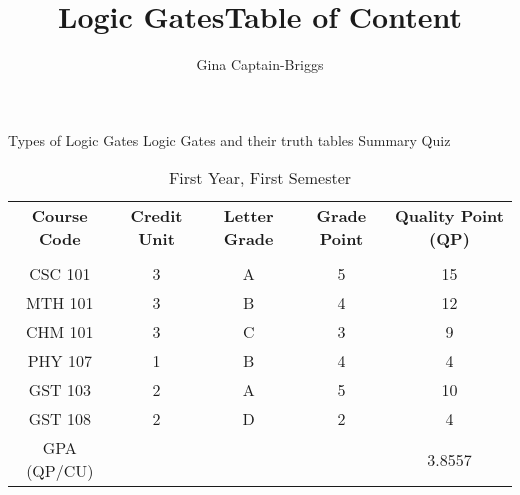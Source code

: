 \documentclass{article}
\begin{document}
 \maketitle\title{Logic Gates}
	\author{Gina Captain-Briggs}
	\newpage
    \title{Table of Content}
    \makeglossary
    Types of Logic Gates
    Logic Gates and their truth tables
    Summary
    Quiz
    \newpage

\begin{table}[h!]
	\begin{center}
		\caption{First Year, First Semester}
		\label{tab:table1}
		\begin{tabular}{|c|S|S|S|c|}
			\textbf{Course Code} & \textbf{Credit Unit} & 
			\textbf{Letter Grade} &
			\textbf{Grade Point} &
			\textbf{Quality Point (QP)}\\
			 &  &  &  &   \\
			\hline
			CSC 101 & 3 & A & 5 & 15\\
			MTH 101 & 3 & B & 4 & 12\\
			CHM 101 & 3 & C & 3 & 9\\
			PHY 107 & 1 & B & 4 & 4\\
			GST 103 & 2 & A & 5 & 10\\
			GST 108 & 2 & {D} & 2 & 4\\
			GPA (QP/CU) &   &   &   & 3.8557\\
			\hline
		\end{tabular}
	\end{center}
\end{table}
\end{document}
